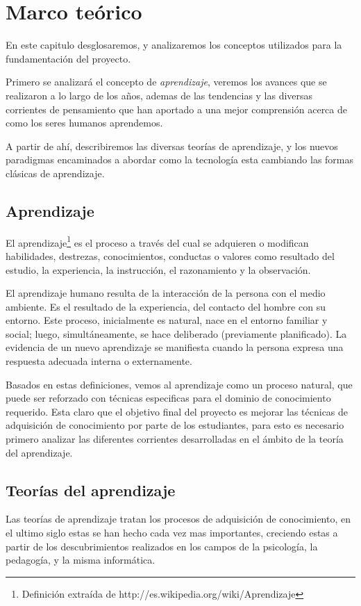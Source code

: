 \chapter{Marco teórico}

En este capitulo desglosaremos, y analizaremos los conceptos utilizados para la
fundamentación del proyecto.

Primero se analizará el concepto de \emph{aprendizaje}, veremos los avances
que se realizaron a lo largo de los años, ademas de las tendencias y las
diversas corrientes de pensamiento que han aportado a una mejor comprensión
acerca de como los seres humanos aprendemos.

A partir de ahí, describiremos las diversas teorías de aprendizaje, y los
nuevos paradigmas encaminados a abordar como la tecnología esta cambiando las
formas clásicas de aprendizaje.

\section{Aprendizaje}

El aprendizaje\footnote{Definición extraída de
http://es.wikipedia.org/wiki/Aprendizaje} es el proceso a través del cual se
adquieren o modifican habilidades, destrezas, conocimientos, conductas o
valores como resultado del estudio, la experiencia, la instrucción, el
razonamiento y la observación.

El aprendizaje humano resulta de la interacción de la persona con el medio
ambiente. Es el resultado de la experiencia, del contacto del hombre con su
entorno. Este proceso, inicialmente es natural, nace en el entorno familiar y
social; luego, simultáneamente, se hace deliberado (previamente planificado).
La evidencia de un nuevo aprendizaje se manifiesta cuando la persona expresa
una respuesta adecuada interna o externamente.\cite{Rojas}

Basados en estas definiciones, vemos al aprendizaje como un proceso natural, 
que puede ser reforzado con técnicas especificas para el dominio de 
conocimiento requerido. Esta claro que el objetivo final del proyecto es 
mejorar las técnicas de adquisición de conocimiento por parte de los 
estudiantes, para esto es necesario primero analizar las diferentes corrientes
desarrolladas en el ámbito de la teoría del aprendizaje.

\section{Teorías del aprendizaje}
Las teorías de aprendizaje tratan los procesos de adquisición de
conocimiento, en el ultimo siglo estas se han hecho cada vez mas importantes,
creciendo estas a partir de los descubrimientos realizados en los campos de la 
psicología, la pedagogía, y la misma informática.


